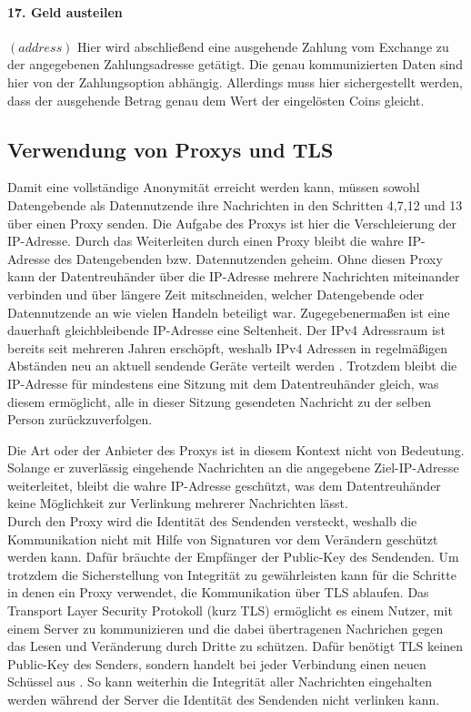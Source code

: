 \documentclass{scrreprt}
\begin{document}
\paragraph{17. Geld austeilen} $(address)$
Hier wird abschließend eine ausgehende Zahlung vom Exchange zu der angegebenen Zahlungsadresse getätigt. Die genau kommunizierten Daten sind hier von der Zahlungsoption abhängig. Allerdings muss hier sichergestellt werden, dass der ausgehende Betrag genau dem Wert der eingelösten Coins gleicht.

\subsection{Verwendung von Proxys und TLS}
Damit eine vollständige Anonymität erreicht werden kann, müssen sowohl Datengebende als Datennutzende ihre Nachrichten in den Schritten 4,7,12 und 13 über einen Proxy senden. Die Aufgabe des Proxys ist hier die Verschleierung der IP-Adresse. Durch das Weiterleiten durch einen Proxy bleibt die wahre IP-Adresse des Datengebenden bzw. Datennutzenden geheim. Ohne diesen Proxy kann der Datentreuhänder über die IP-Adresse mehrere Nachrichten miteinander verbinden und über längere Zeit mitschneiden, welcher Datengebende oder Datennutzende an wie vielen Handeln beteiligt war. Zugegebenermaßen ist eine dauerhaft gleichbleibende IP-Adresse eine Seltenheit. Der IPv4 Adressraum ist bereits seit mehreren Jahren erschöpft, weshalb IPv4 Adressen in regelmäßigen Abständen neu an aktuell sendende Geräte verteilt werden . Trotzdem bleibt die IP-Adresse für mindestens eine Sitzung mit dem Datentreuhänder gleich, was diesem ermöglicht, alle in dieser Sitzung gesendeten Nachricht zu der selben Person zurückzuverfolgen. 

Die Art oder der Anbieter des Proxys ist in diesem Kontext nicht von Bedeutung. Solange er zuverlässig eingehende Nachrichten an die angegebene Ziel-IP-Adresse weiterleitet, bleibt die wahre IP-Adresse geschützt, was dem Datentreuhänder keine Möglichkeit zur Verlinkung mehrerer Nachrichten lässt.\\

Durch den Proxy wird die Identität des Sendenden versteckt, weshalb die Kommunikation nicht mit Hilfe von Signaturen vor dem Verändern geschützt werden kann. Dafür bräuchte der Empfänger der Public-Key des Sendenden. Um trotzdem die Sicherstellung von Integrität zu gewährleisten kann für die Schritte in denen ein Proxy verwendet, die Kommunikation über TLS ablaufen. Das Transport Layer Security Protokoll (kurz TLS) ermöglicht es einem Nutzer, mit einem Server zu kommunizieren und die dabei übertragenen Nachrichen gegen das Lesen und Veränderung durch Dritte zu schützen. Dafür benötigt TLS keinen Public-Key des Senders, sondern handelt bei jeder Verbindung einen neuen Schüssel aus \cite{Arfaoui2019The}. So kann weiterhin die Integrität aller Nachrichten eingehalten werden während der Server die Identität des Sendenden nicht verlinken kann.
\end{document}
